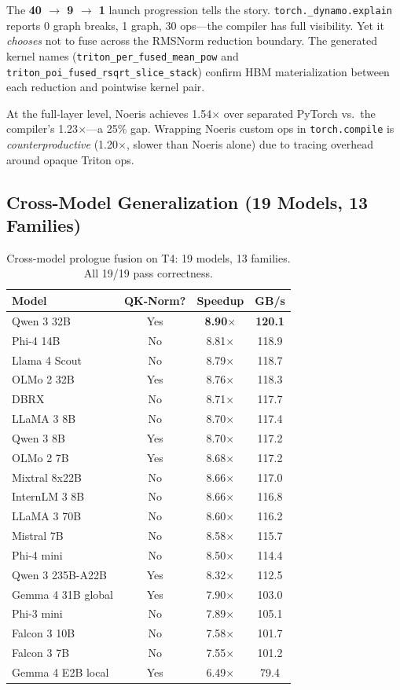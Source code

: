 \documentclass[11pt]{article}
\begin{document}
The \textbf{40 $\to$ 9 $\to$ 1} launch progression tells the story.
\texttt{torch.\_dynamo.explain} reports 0 graph breaks, 1 graph, 30 ops---the
compiler has full visibility. Yet it \emph{chooses} not to fuse across the
RMSNorm reduction boundary. The generated kernel names
(\texttt{triton\_per\_fused\_mean\_pow} and
\texttt{triton\_poi\_fused\_rsqrt\_slice\_stack}) confirm HBM materialization
between each reduction and pointwise kernel pair.

At the full-layer level, Noeris achieves 1.54$\times$ over separated PyTorch
vs.\ the compiler's 1.23$\times$---a 25\% gap. Wrapping Noeris custom ops in
\texttt{torch.compile} is \emph{counterproductive} (1.20$\times$, slower than
Noeris alone) due to tracing overhead around opaque Triton ops.


\subsection{Cross-Model Generalization (19 Models, 13 Families)}
\label{sec:cross-model}

\begin{table}[t]
\centering
\caption{Cross-model prologue fusion on T4: 19 models, 13 families. All 19/19 pass correctness.}
\label{tab:cross-model-t4}
\small
\begin{tabular}{@{}lccc@{}}
\toprule
Model & QK-Norm? & Speedup & GB/s \\
\midrule
Qwen 3 32B & Yes & \textbf{8.90$\times$} & \textbf{120.1} \\
Phi-4 14B & No & 8.81$\times$ & 118.9 \\
Llama 4 Scout & No & 8.79$\times$ & 118.7 \\
OLMo 2 32B & Yes & 8.76$\times$ & 118.3 \\
DBRX & No & 8.71$\times$ & 117.7 \\
LLaMA 3 8B & No & 8.70$\times$ & 117.4 \\
Qwen 3 8B & Yes & 8.70$\times$ & 117.2 \\
OLMo 2 7B & Yes & 8.68$\times$ & 117.2 \\
Mixtral 8x22B & No & 8.66$\times$ & 117.0 \\
InternLM 3 8B & No & 8.66$\times$ & 116.8 \\
LLaMA 3 70B & No & 8.60$\times$ & 116.2 \\
Mistral 7B & No & 8.58$\times$ & 115.7 \\
Phi-4 mini & No & 8.50$\times$ & 114.4 \\
Qwen 3 235B-A22B & Yes & 8.32$\times$ & 112.5 \\
Gemma 4 31B global & Yes & 7.90$\times$ & 103.0 \\
Phi-3 mini & No & 7.89$\times$ & 105.1 \\
Falcon 3 10B & No & 7.58$\times$ & 101.7 \\
Falcon 3 7B & No & 7.55$\times$ & 101.2 \\
Gemma 4 E2B local & Yes & 6.49$\times$ & 79.4 \\
\bottomrule
\end{tabular}
\end{table}
\end{document}
